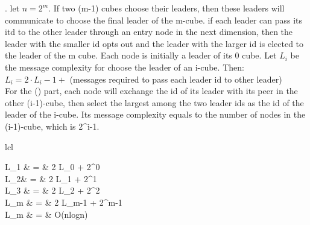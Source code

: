 \documentclass[12pt]{article}
\newcounter{question}
\newcommand{\question}[1]{
    \stepcounter{question}
    \thequestion. #1 \hfill
}
\begin{document}
\question{let $n = 2^m$.  If two (m-1) cubes choose their leaders, then these leaders will communicate to choose the final leader of the m-cube.  if each leader can pass its itd to the other leader through an entry node in the next dimension, then the leader with the smaller id opts out and the leader with the larger id is elected to the leader of the m cube.  Each node is initially a leader of its 0 cube.  Let $L_i$ be the message complexity for choose the leader of an i-cube. Then: \\ $L_i  = 2 \cdot L_i-1 +$ (messages required to pass each leader id to other leader) \\
    For the () part, each node will exchange the id of its leader with its peer in the other (i-1)-cube, then select the largest among the two leader ids as the id of the leader of the i-cube. Its message complexity equals to the number of nodes in the (i-1)-cube, which is 2^{i-1}.


    \begin{array}{lcl}

        L_1 & = & 2 \cdot L_0 + 2\cdot2^0 \\
        L_2& = & 2 \cdot L_1 + 2\cdot2^1 \\
        L_3 & = & 2 \cdot L_2 + 2\cdot2^2 \\
        L_m & = & 2 \cdot L_{m-1} + 2\cdot2^{m-1} \cdots \\
        L_m & = & O(nlogn) \\
    \end{array}
}
\end{document}

